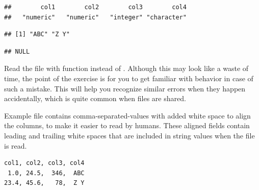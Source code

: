 \documentclass[krantz2]{krantz}\usepackage{knitr}
\begin{document}
\begin{knitrout}\footnotesize
{}\color{fgcolor}\begin{kframe}
\begin{alltt}
\end{alltt}
\begin{verbatim}
##        col1        col2        col3        col4
##   "numeric"   "numeric"   "integer" "character"
\end{verbatim}
\begin{alltt}
\hlstd{from_csv_a.df[[}\hlstd{]]}
\end{alltt}
\begin{verbatim}
## [1] "ABC" "Z Y"
\end{verbatim}
\begin{alltt}
\hlstd{(from_csv_a.df[[}\hlstd{]])}
\end{alltt}
\begin{verbatim}
## NULL
\end{verbatim}
\end{kframe}
\end{knitrout}

\begin{playground}
Read the file  with function  instead of . Although this may look like a waste of time, the point of the exercise is for you to get familiar with \Rlang behavior in case of such a mistake. This will help you recognize similar errors when they happen accidentally, which is quite common when files are shared.
\end{playground}

Example file  contains comma-separated-values with added white space to align the columns, to make it easier to read by humans. These aligned fields contain leading and trailing white spaces that are included in string values when the file is read.

\begin{knitrout}\footnotesize
{}\color{fgcolor}\begin{kframe}
\begin{verbatim}
col1, col2, col3, col4
 1.0, 24.5,  346,  ABC
23.4, 45.6,   78,  Z Y
\end{verbatim}
\end{kframe}
\end{knitrout}
\end{document}
